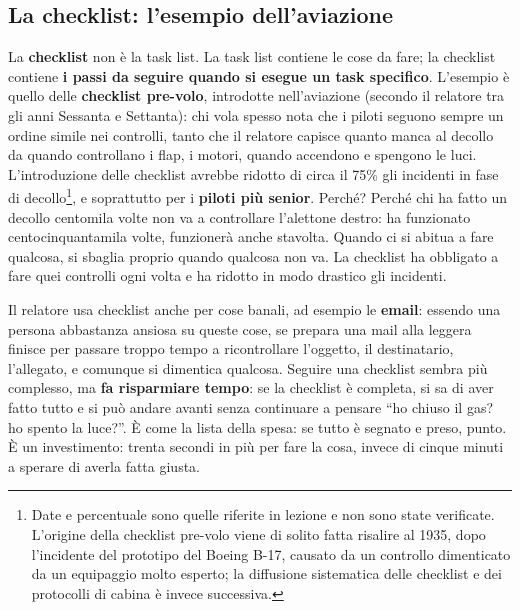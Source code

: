 \subsection{La checklist: l'esempio dell'aviazione}

La \textbf{checklist} non è la task list. La task list contiene le cose da fare;
la checklist contiene \textbf{i passi da seguire quando si esegue un task
specifico}. L'esempio è quello delle \textbf{checklist pre-volo}, introdotte
nell'aviazione (secondo il relatore tra gli anni Sessanta e Settanta): chi vola
spesso nota che i piloti seguono sempre un ordine simile nei controlli, tanto
che il relatore capisce quanto manca al decollo da quando controllano i flap, i
motori, quando accendono e spengono le luci. L'introduzione delle checklist
avrebbe ridotto di circa il 75\% gli incidenti in fase di decollo\footnote{Date
e percentuale sono quelle riferite in lezione e non sono state verificate.
L'origine della checklist pre-volo viene di solito fatta risalire al 1935, dopo
l'incidente del prototipo del Boeing B-17, causato da un controllo dimenticato da
un equipaggio molto esperto; la diffusione sistematica delle checklist e dei
protocolli di cabina è invece successiva.}, e soprattutto per i \textbf{piloti
più senior}. Perché? Perché chi ha fatto un decollo centomila volte non va a
controllare l'alettone destro: ha funzionato centocinquantamila volte, funzionerà
anche stavolta. Quando ci si abitua a fare qualcosa, si sbaglia proprio quando
qualcosa non va. La checklist ha obbligato a fare quei controlli ogni volta e ha
ridotto in modo drastico gli incidenti.

Il relatore usa checklist anche per cose banali, ad esempio le \textbf{email}:
essendo una persona abbastanza ansiosa su queste cose, se prepara una mail alla
leggera finisce per passare troppo tempo a ricontrollare l'oggetto, il
destinatario, l'allegato, e comunque si dimentica qualcosa. Seguire una checklist
sembra più complesso, ma \textbf{fa risparmiare tempo}: se la checklist è
completa, si sa di aver fatto tutto e si può andare avanti senza continuare a
pensare ``ho chiuso il gas? ho spento la luce?''. È come la lista della spesa: se
tutto è segnato e preso, punto. È un investimento: trenta secondi in più per
fare la cosa, invece di cinque minuti a sperare di averla fatta giusta.


